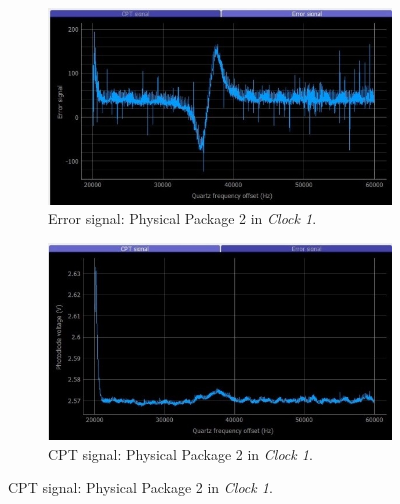 \documentclass[a4paper,12pt]{article}
\begin{document}
\begin{figure}[!h]
\centering
\begin{subfigure}[b]{0.49\textwidth}
\centering
\includegraphics[height=0.5\textwidth]{Images/c1_pp2_1_2.jpg}
\captionsetup{justification=centering}
\caption{Error signal: Physical Package 2 in \textit{Clock 1}.}
\end{subfigure}
\hfill
\begin{subfigure}[b]{0.49\textwidth}
\centering
\includegraphics[height=0.5\textwidth]{Images/c1_pp2_2_2.jpg}
\captionsetup{justification=centering}
\caption{CPT signal: Physical Package 2 in \textit{Clock 1}.}
\end{subfigure}


\end{figure}
\end{document}
